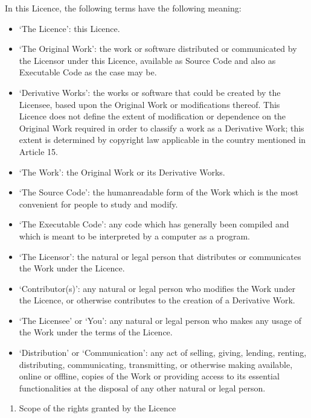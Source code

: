 \documentclass[letterpaper,10pt,english]{sphinxmanual}
\begin{document}
\sphinxAtStartPar
In this Licence, the following terms have the following meaning:
\begin{itemize}
\item {} 
\sphinxAtStartPar
‘The Licence’: this Licence.

\item {} 
\sphinxAtStartPar
‘The Original Work’: the work or software distributed or communicated by the
Licensor under this Licence, available as Source Code and also as Executable
Code as the case may be.

\item {} 
\sphinxAtStartPar
‘Derivative Works’: the works or software that could be created by the
Licensee, based upon the Original Work or modifications thereof. This Licence
does not define the extent of modification or dependence on the Original Work
required in order to classify a work as a Derivative Work; this extent is
determined by copyright law applicable in the country mentioned in Article 15.

\item {} 
\sphinxAtStartPar
‘The Work’: the Original Work or its Derivative Works.

\item {} 
\sphinxAtStartPar
‘The Source Code’: the human\sphinxhyphen{}readable form of the Work which is the most
convenient for people to study and modify.

\item {} 
\sphinxAtStartPar
‘The Executable Code’: any code which has generally been compiled and which is
meant to be interpreted by a computer as a program.

\item {} 
\sphinxAtStartPar
‘The Licensor’: the natural or legal person that distributes or communicates
the Work under the Licence.

\item {} 
\sphinxAtStartPar
‘Contributor(s)’: any natural or legal person who modifies the Work under the
Licence, or otherwise contributes to the creation of a Derivative Work.

\item {} 
\sphinxAtStartPar
‘The Licensee’ or ‘You’: any natural or legal person who makes any usage of
the Work under the terms of the Licence.

\item {} 
\sphinxAtStartPar
‘Distribution’ or ‘Communication’: any act of selling, giving, lending,
renting, distributing, communicating, transmitting, or otherwise making
available, online or offline, copies of the Work or providing access to its
essential functionalities at the disposal of any other natural or legal
person.

\end{itemize}
\begin{enumerate}
%
\setcounter{enumi}{1}
\item {} 
\sphinxAtStartPar
Scope of the rights granted by the Licence

\end{enumerate}
\end{document}
